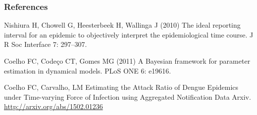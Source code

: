 \documentclass[10pt,compress,notheorems]{beamer}
\begin{document}
\begin{frame}[fragile]
\frametitle{References}
\begin{thebibliography}{10}
Nishiura H, Chowell G, Heesterbeek H, Wallinga J (2010) {{T}he ideal reporting
  interval for an epidemic to objectively interpret the epidemiological time
  course}.
\newblock J R Soc Interface 7: 297--307.

Coelho FC, Code\c{c}o CT, Gomes MG (2011) {A} {B}ayesian framework for
  parameter estimation in dynamical models.
\newblock PLoS ONE 6: e19616.

Coelho FC, Carvalho, LM {E}stimating the Attack Ratio of Dengue 
Epidemics under Time-varying Force of Infection using Aggregated Notification 
Data
\newblock Arxiv. \url{http://arxiv.org/abs/1502.01236}
\end{thebibliography}

\end{frame}
\end{document}
